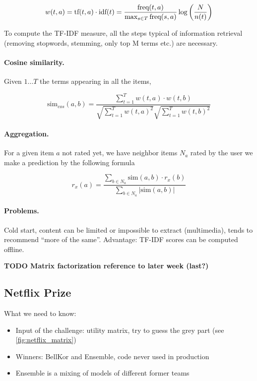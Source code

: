 \[
  w(t,a) = \text{tf}(t,a) \cdot \text{idf}(t) = \frac{\text{freq}(t,a)}{\max_{s\in T} \text{freq}(s,a)}\log\left(\frac{N}{n(t)}\right)
\]

To compute the TF-IDF measure, all the steps typical of information retrieval (removing stopwords, stemming, only top M terms etc.) are necessary.

\paragraph{Cosine similarity.} Given $1 \dots T$ the terms appearing in all the items,

\[
  \text{sim}_{cos}(a,b) = \frac {\sum_{t=1}^T w(t,a)\cdot w(t,b)}{\sqrt{\sum_{t=1}^T w(t,a)^2}\sqrt{\sum_{t=1}^T w(t,b)^2}}
\]

\paragraph{Aggregation.} For a given item $a$ not rated yet, we have neighbor items $N_a$ rated by the user we make a prediction by the following formula

\[
  r_x(a) = \frac {\sum_{b\in N_a} \text{sim}(a,b) \cdot r_x(b)}{\sum_{b\in N_a} | \text{sim}(a,b)|}
\]

\paragraph{Problems.} Cold start, content can be limited or impossible to extract (multimedia), tends to recommend “more of the same”. Advantage: TF-IDF scores can be computed offline.

\textbf{TODO Matrix factorization reference to later week (last?)}

\subsection{Netflix Prize}

What we need to know:

\begin{itemize}
  \item Input of the challenge: utility matrix, try to guess the grey part (see \cref{fig:netflix_matrix})
  \item Winners: BellKor and Ensemble, code never used in production
  \item Ensemble is a mixing of models of different former teams
\end{itemize}

